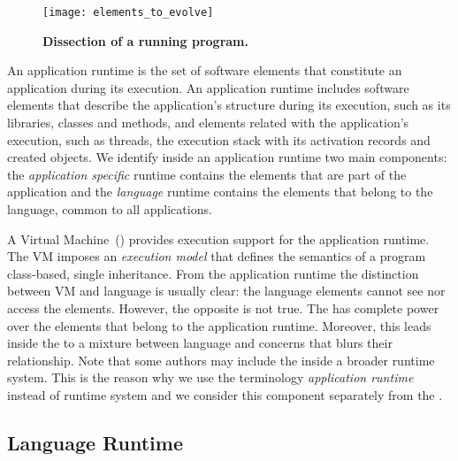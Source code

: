 \begin{figure}[!ht]
\begin{center}
\texttt{[image: elements\_to\_evolve]}
\caption{\textbf{Dissection of a running program.}\label{fig:whatToEvolve} }
\end{center}
\end{figure}

An application runtime is the set of software elements that constitute an application during its execution. An application runtime includes software elements that describe the application's structure during its execution, such as its libraries, classes and methods, and elements related with the application's execution, such as threads, the execution stack with its activation records and created objects. We identify inside an application runtime two main components: the \emph{application specific} runtime contains the elements that are part of the application and the \emph{language} runtime contains the elements that belong to the language, common to all applications.

A Virtual Machine~(\VM) provides execution support for the application runtime. The VM imposes an \emph{execution model} that defines the semantics of a program \eg class-based, single inheritance. From the application runtime the distinction between VM and language is usually clear: the language elements cannot see nor access the \VM elements. However, the opposite is not true. The \VM has complete power over the elements that belong to the application runtime. Moreover, this leads inside the \VM to a mixture between language and \VM concerns that blurs their relationship.
Note that some authors may include the \VM inside a broader runtime system.
This is the reason why we use the terminology \emph{application runtime} instead of runtime system and we consider this component separately from the \VM.

\subsection{Language Runtime}

